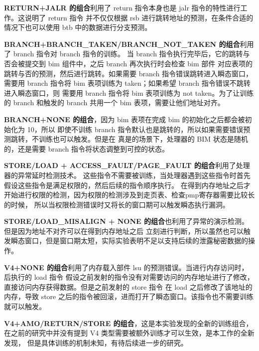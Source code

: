 \textbf{RETURN+JALR 的组合}利用了 return 指令本身也是 jalr 指令的特性进行工作。这说明了 return 指令
并不仅仅根据 rsb 进行跳转地址的预测，在条件合适的情况下也可以使用 btb 中的数据进行分支预测。\par

\textbf{BRANCH+BRANCH\_TAKEN/BRANCH\_NOT\_TAKEN 的组合}利用了 branch 指令对 branch 指令的训练。
当 branch 指令执行完毕后，它的跳转与否会被提交到 bim 组件中，之后 branch 再次执行时会检查 bim 部件
对应表项的跳转与否的预测，然后进行跳转。如果需要 branch 指令错误跳转进入瞬态窗口，
需要用 branch 指令将 bim 表项训练为 taken；如果希望 branch 指令错误不跳转进入瞬态窗口，则
需要用 branch 指令将 bim 表项训练为 not taken。为了让训练的 branch 和触发的 branch 共用一个 bim
表项，需要让他们地址对齐。\par

\textbf{BRANCH+NONE 的组合}，因为 bim 表项在完成 bim 的初始化之后都会被初始化为 10，所以
即使不训练 branch 指令默认也是跳转的，所以如果需要错误预测跳转，不训练也可以触发。但是在
真是的场景下，处理器的 BIM 状态是随机的，还是需要 branch 指令将状态调整到可控的状态。\par

\textbf{STORE/LOAD + ACCESS\_FAULT/PAGE\_FAULT 的组合}利用了处理器的异常延时检测技术。
这些指令不需要被训练，当处理器遇到这些指令时首先假设这些指令是满足权限的，然后后续的指令顺序执行。
在得到内存地址之后才开始进行权限的检测，因为权限的检测涉及到走页表、检查pmp寄存器需要比较长的时候，
所以当权限检测错误时又将长的窗口期可以触发瞬态执行漏洞。\par

\textbf{STORE/LOAD\_MISALIGN + NONE 的组合}也利用了异常的演示检测。但是因为地址不对齐可以在得到内存地址之后
立刻进行判断，所以虽然也可以触发瞬态窗口，但是窗口期太短，实际实验表明不足以支持后续的泄露秘密数据的操作。\par

\textbf{V4+NONE 的组合}利用了内存载入部件 lsu 的预测错误。当进行内存访问时，后执行的 load 指令
假设之前发射的指令没有对需要访问的内存地址进行了修改，直接访问内存获得数据。但是之前发射的 store 指令
在 load 之后修改了该地址的内存，导致 store 之后的指令被回滚，进而打开了瞬态窗口。该指令也不需要训练就可以触发。\par

\textbf{V4+AMO/RETURN/STORE 的组合}，这是本实验发现的全新的训练组合，
在之前的研究中并没有提到 V4 类型需要被额外训练才可以生效，是本工作的全新发现，
但是具体训练的机制未知，有待后续进一步的研究。\par

